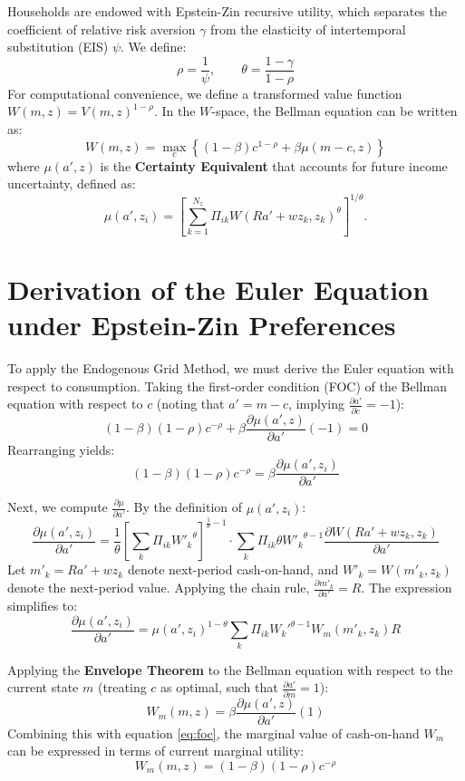\documentclass[a4paper,12pt]{article}
\begin{document}
Households are endowed with Epstein-Zin recursive utility, which separates the coefficient of relative risk aversion $\gamma$ from the elasticity of intertemporal substitution (EIS) $\psi$. We define:
\[
    \rho = \frac{1}{\psi},\qquad \theta = \frac{1-\gamma}{1-\rho}
\]
For computational convenience, we define a transformed value function $W(m,z) = V(m,z)^{1-\rho}$. In the $W$-space, the Bellman equation can be written as:
\[
    W(m,z)
    =
    \max_{c} \left\{ (1-\beta)c^{1-\rho} + \beta \mu(m-c, z) \right\}
\]
where $\mu(a', z)$ is the \textbf{Certainty Equivalent} that accounts for future income uncertainty, defined as:
\[
    \mu(a',z_i)
    =
    \left[
        \sum_{k=1}^{N_z}
        \Pi_{ik}
        W(R a'+wz_k,z_k)^\theta
    \right]^{1/\theta}.
\]

\section{Derivation of the Euler Equation under Epstein-Zin Preferences}

To apply the Endogenous Grid Method, we must derive the Euler equation with respect to consumption. Taking the first-order condition (FOC) of the Bellman equation with respect to $c$ (noting that $a' = m - c$, implying $\frac{\partial a'}{\partial c} = -1$):
\[
    (1-\beta)(1-\rho) c^{-\rho} + \beta \frac{\partial \mu(a', z)}{\partial a'} (-1) = 0
\]
Rearranging yields:
\begin{equation}
    (1-\beta)(1-\rho) c^{-\rho} = \beta \frac{\partial \mu(a', z_i)}{\partial a'} \label{eq:foc}
\end{equation}

Next, we compute $\frac{\partial \mu}{\partial a'}$. By the definition of $\mu(a', z_i)$:
\[
    \frac{\partial \mu(a', z_i)}{\partial a'}
    =
    \frac{1}{\theta} \left[ \sum_{k} \Pi_{ik} {W'_{k}}^{\theta} \right]^{\frac{1}{\theta}-1} 
    \cdot \sum_{k} \Pi_{ik} \theta {W'_{k}}^{\theta-1} \frac{\partial W(R a' + w z_k, z_k)}{\partial a'}
\]
Let $m'_k = R a' + w z_k$ denote next-period cash-on-hand, and $W'_k = W(m'_k, z_k)$ denote the next-period value. Applying the chain rule, $\frac{\partial m'_k}{\partial a'} = R$. The expression simplifies to:
\begin{equation}
    \frac{\partial \mu(a', z_i)}{\partial a'} = \mu(a', z_i)^{1-\theta} \sum_{k} \Pi_{ik} {W_k'}^{\theta-1} W_m(m'_k, z_k) R \label{eq:dmu_da}
\end{equation}

Applying the \textbf{Envelope Theorem} to the Bellman equation with respect to the current state $m$ (treating $c$ as optimal, such that $\frac{\partial a'}{\partial m} = 1$):
\[
    W_m(m, z) = \beta \frac{\partial \mu(a', z)}{\partial a'} (1)
\]
Combining this with equation \eqref{eq:foc}, the marginal value of cash-on-hand $W_m$ can be expressed in terms of current marginal utility:
\begin{equation}
    W_m(m, z) = (1-\beta)(1-\rho) c^{-\rho} \label{eq:envelope}
\end{equation}
\end{document}
